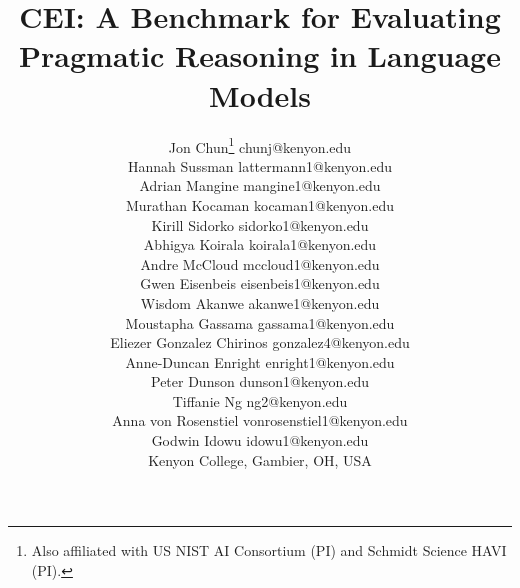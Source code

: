 \documentclass[twoside,11pt]{article}
\begin{document}
\title{CEI: A Benchmark for Evaluating Pragmatic Reasoning in Language Models}

\author{\name Jon Chun\thanks{Also affiliated with US NIST AI Consortium (PI) and Schmidt Science HAVI (PI).} \email chunj@kenyon.edu \\
       \name Hannah Sussman \email lattermann1@kenyon.edu \\
       \name Adrian Mangine \email mangine1@kenyon.edu \\
       \name Murathan Kocaman \email kocaman1@kenyon.edu \\
       \name Kirill Sidorko \email sidorko1@kenyon.edu \\
       \name Abhigya Koirala \email koirala1@kenyon.edu \\
       \name Andre McCloud \email mccloud1@kenyon.edu \\
       \name Gwen Eisenbeis \email eisenbeis1@kenyon.edu \\
       \name Wisdom Akanwe \email akanwe1@kenyon.edu \\
       \name Moustapha Gassama \email gassama1@kenyon.edu \\
       \name Eliezer Gonzalez Chirinos \email gonzalez4@kenyon.edu \\
       \name Anne-Duncan Enright \email enright1@kenyon.edu \\
       \name Peter Dunson \email dunson1@kenyon.edu \\
       \name Tiffanie Ng \email ng2@kenyon.edu \\
       \name Anna von Rosenstiel \email vonrosenstiel1@kenyon.edu \\
       \name Godwin Idowu \email idowu1@kenyon.edu \\
       \addr Kenyon College, Gambier, OH, USA}


\maketitle
\end{document}
